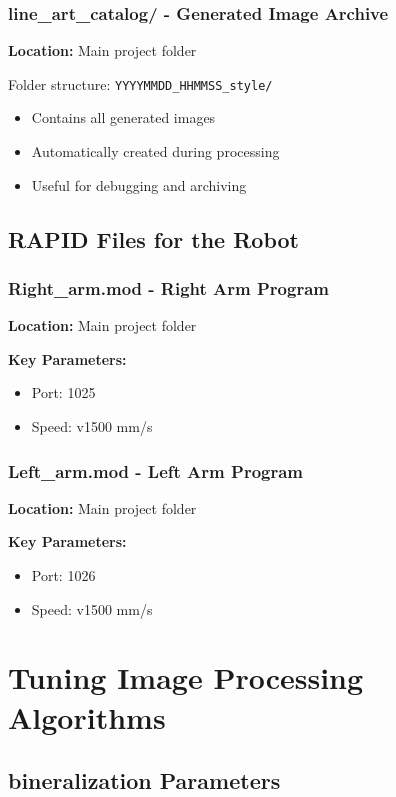 \documentclass[a4paper,12pt]{article}
\begin{document}
\subsubsection{line\_art\_catalog/ - Generated Image Archive}
\textbf{Location:} Main project folder

Folder structure: \texttt{YYYYMMDD\_HHMMSS\_style/}
\begin{itemize}
\item Contains all generated images
\item Automatically created during processing
\item Useful for debugging and archiving
\end{itemize}

\subsection{RAPID Files for the Robot}

\subsubsection{Right\_arm.mod - Right Arm Program}
\textbf{Location:} Main project folder

\textbf{Key Parameters:}
\begin{itemize}
\item Port: 1025
\item Speed: v1500 mm/s
\end{itemize}

\subsubsection{Left\_arm.mod - Left Arm Program}
\textbf{Location:} Main project folder

\textbf{Key Parameters:}
\begin{itemize}
\item Port: 1026
\item Speed: v1500 mm/s
\end{itemize}

\section{Tuning Image Processing Algorithms}

\subsection{bineralization Parameters}
\end{document}

